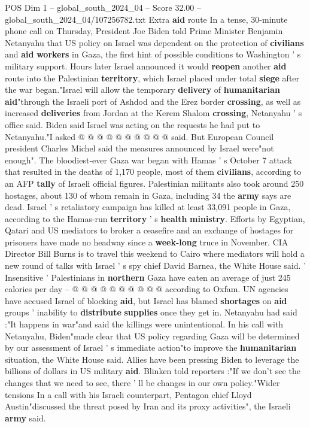\begin{textsample}{POS Dim 1 – global\_south\_2024\_04 – Score 32.00 – global\_south\_2024\_04/107256782.txt}
Extra \textbf{aid} route In a tense, 30-minute phone call on Thursday, President Joe Biden told Prime Minister Benjamin Netanyahu that US policy on Israel was dependent on the protection of \textbf{civilians} and \textbf{aid} \textbf{workers} in Gaza, the first hint of possible conditions to Washington ' s military support.
Hours later Israel announced it would \textbf{reopen} another \textbf{aid} route into the Palestinian \textbf{territory}, which Israel placed under total \textbf{siege} after the war began."Israel will allow the temporary \textbf{delivery} of \textbf{humanitarian} \textbf{aid}"through the Israeli port of Ashdod and the Erez border \textbf{crossing}, as well as increased \textbf{deliveries} from Jordan at the Kerem Shalom \textbf{crossing}, Netanyahu ' s office said.
Biden said Israel was acting on the requests he had put to Netanyahu."I asked @ @ @ @ @ @ @ @ @ @ said.
But European Council president Charles Michel said the measures announced by Israel were"not enough".
The bloodiest-ever Gaza war began with Hamas ' s October 7 attack that resulted in the deaths of 1,170 people, most of them \textbf{civilians}, according to an AFP \textbf{tally} of Israeli official figures.
Palestinian militants also took around 250 hostages, about 130 of whom remain in Gaza, including 34 the \textbf{army} says are dead.
Israel ' s retaliatory campaign has killed at least 33,091 people in Gaza, according to the Hamas-run \textbf{territory} ' s \textbf{health} \textbf{ministry}.
Efforts by Egyptian, Qatari and US mediators to broker a ceasefire and an exchange of hostages for prisoners have made no headway since a \textbf{week-long} truce in November.
CIA Director Bill Burns is to travel this weekend to Cairo where mediators will hold a new round of talks with Israel ' s spy chief David Barnea, the White House said. ' Insensitive ' Palestinians in \textbf{northern} Gaza have eaten an average of just 245 calories per day -- @ @ @ @ @ @ @ @ @ @ according to Oxfam.
UN agencies have accused Israel of blocking \textbf{aid}, but Israel has blamed \textbf{shortages} on \textbf{aid} groups ' inability to \textbf{distribute} \textbf{supplies} once they get in.
Netanyahu had said :"It happens in war"and said the killings were unintentional.
In his call with Netanyahu, Biden"made clear that US policy regarding Gaza will be determined by our assessment of Israel ' s immediate action"to improve the \textbf{humanitarian} situation, the White House said.
Allies have been pressing Biden to leverage the billions of dollars in US military \textbf{aid}.
Blinken told reporters :"If we don't see the changes that we need to see, there ' ll be changes in our own policy."Wider tensions In a call with his Israeli counterpart, Pentagon chief Lloyd Austin"discussed the threat posed by Iran and its proxy activities", the Israeli \textbf{army} said.

\end{textsample}
